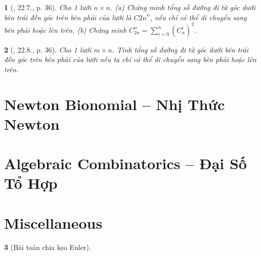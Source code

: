 \documentclass{article}
\newtheorem{baitoan}{}
\begin{document}
\begin{baitoan}[\cite{Hai_Hung_Thu_Tung_ncpt_Toan_10_tap_2}, 22.7., p. 36]
	Cho 1 lưới $n\times n$. (a) Chứng minh tổng số đường đi từ góc dưới bên trái đến góc trên bên phải của lưới là $C{2n}^n$, nếu chỉ có thể di chuyển sang bên phải hoặc lên trên. (b) Chứng minh $C_{2n}^n = \sum_{i=0}^n (C_n^i)^2$.
\end{baitoan}

\begin{baitoan}[\cite{Hai_Hung_Thu_Tung_ncpt_Toan_10_tap_2}, 22.8., p. 36]
	Cho 1 lưới $m\times n$. Tính tổng số đường đi từ góc dưới bên trái đến góc trên bên phải của lưới nếu ta chỉ có thể di chuyển sang bên phải hoặc lên trên.
\end{baitoan}


\section{Newton Bionomial -- Nhị Thức Newton}


\section{Algebraic Combinatorics -- Đại Số Tổ Hợp}


\section{Miscellaneous}

\begin{baitoan}[Bài toán chia kẹo Euler]
	
\end{baitoan}


\printbibliography[heading=bibintoc]
	
\end{document}
